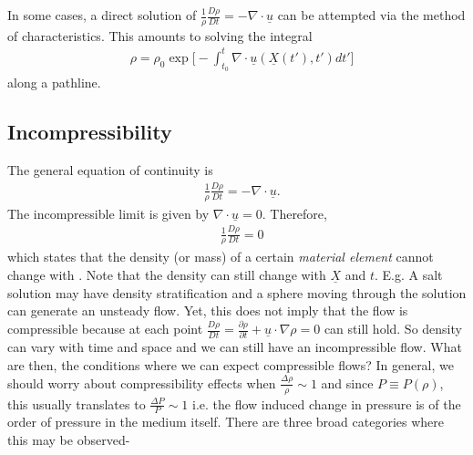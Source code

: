 \documentclass[11pt,a4paper]{article}
\newcommand{\pd}[2]{\frac{\partial #1}{\partial #2}}
\newcommand{\vect}[1]{\underline{#1}}
\newcommand{\1}{\vect{1}}
\newcommand{\grad}{\nabla}
\newcommand{\divg}[1]{\grad\cdot\vect{#1}}
\newcommand{\vu}{\vect{u}}
\begin{document}
In some cases, a direct solution of $\frac{1}{\rho}\frac{D\rho}{Dt} =- \divg u$ can be attempted via the method of characteristics. This amounts to solving the integral 
\begin{align*}
&\rho = \rho_0\exp\bigg[-\int_{t_0}^t \divg u(\vect X(t'),t')dt'\bigg]
\end{align*}
along a pathline.

\subsection{Incompressibility}
The general equation of continuity is 
\begin{align*}
&\frac{1}{\rho}\frac{D\rho}{Dt} =- \divg u.
\end{align*}
The incompressible limit is given by $\divg u = 0$. Therefore,
\begin{align*}
&\frac{1}{\rho}\frac{D\rho}{Dt} = 0
\end{align*}
which states that the density (or mass) of a certain \textit{material element} cannot change with . Note that the density can still change with $\vect X$ and $t$. E.g. A salt solution may have density stratification and a sphere moving through the solution can generate an unsteady flow. Yet, this does not imply that the flow is compressible because at each point $\frac{D\rho}{Dt} = \pd{\rho}{t} + \vu\cdot\grad\rho = 0$ can still hold. So density can vary with time and space and we can still have an incompressible flow. What are then, the conditions where we can expect compressible flows? In general, we should worry about compressibility effects when $\frac{\Delta \rho}{\rho}\sim 1$ and since $P\equiv P(\rho)$, this usually translates to $\frac{\Delta P}{P} \sim 1$ i.e. the flow induced change in pressure is of the order of pressure in the medium itself. There are three broad categories where this may be observed-
\end{document}
